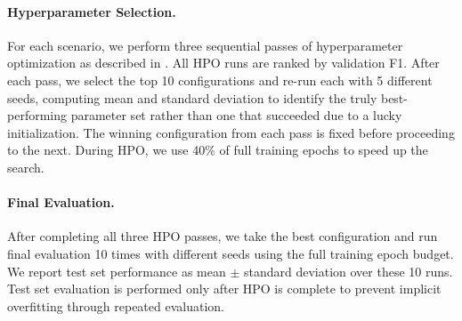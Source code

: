 \paragraph{Hyperparameter Selection.}
For each scenario, we perform three sequential passes of hyperparameter optimization as described in . All HPO runs are ranked by validation F1. After each pass, we select the top 10 configurations and re-run each with 5 different seeds, computing mean and standard deviation to identify the truly best-performing parameter set rather than one that succeeded due to a lucky initialization. The winning configuration from each pass is fixed before proceeding to the next. During HPO, we use 40\% of full training epochs to speed up the search.

\paragraph{Final Evaluation.}
After completing all three HPO passes, we take the best configuration and run final evaluation 10 times with different seeds using the full training epoch budget. We report test set performance as mean $\pm$ standard deviation over these 10 runs. Test set evaluation is performed only after HPO is complete to prevent implicit overfitting through repeated evaluation.
